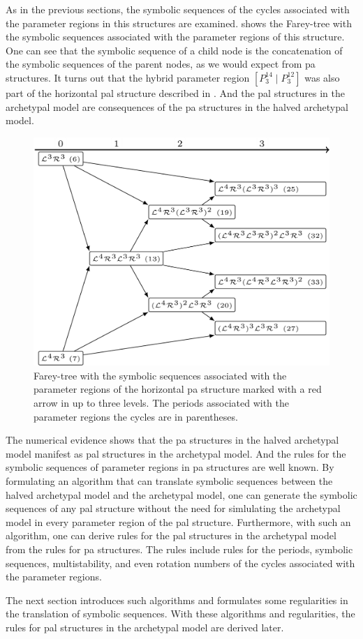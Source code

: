 As in the previous sections, the symbolic sequences of the cycles associated with the parameter regions in this structures are examined.
 shows the Farey-tree with the symbolic sequences associated with the parameter regions of this structure.
One can see that the symbolic sequence of a child node is the concatenation of the symbolic sequences of the parent nodes, as we would expect from \gls{pa} structures.
It turns out that the hybrid parameter region $\left[P^{14}_3 \mid P^{12}_3\right]$ was also part of the horizontal \gls{pal} structure described in .
And the \gls{pal} structures in the archetypal model are consequences of the \gls{pa} structures in the halved archetypal model.

\begin{figure}
	\centering
	\includegraphics[width=.7 \textwidth]{../Figures/7/7.20/adding.png}
	\caption[Farey-tree with the symbolic sequences of a horizontal  structure]{
		Farey-tree with the symbolic sequences associated with the parameter regions of the horizontal \gls{pa} structure marked with a red arrow in  up to three levels.
		The periods associated with the parameter regions the cycles are in parentheses.
	}
	\label{fig:halved.hor.tree}
\end{figure}

The numerical evidence shows that the \gls{pa} structures in the halved archetypal model manifest as \gls{pal} structures in the archetypal model.
And the rules for the symbolic sequences of parameter regions in \gls{pa} structures are well known.
By formulating an algorithm that can translate symbolic sequences between the halved archetypal model and the archetypal model, one can generate the symbolic sequences of any \gls{pal} structure without the need for simlulating the archetypal model in every parameter region of the \gls{pal} structure.
Furthermore, with such an algorithm, one can derive rules for the \gls{pal} structures in the archetypal model from the rules for \gls{pa} structures.
The rules include rules for the periods, symbolic sequences, multistability, and even rotation numbers of the cycles associated with the parameter regions.

The next section introduces such algorithms and formulates some regularities in the translation of symbolic sequences.
With these algorithms and regularities, the rules for \gls{pal} structures in the archetypal model are derived later.
